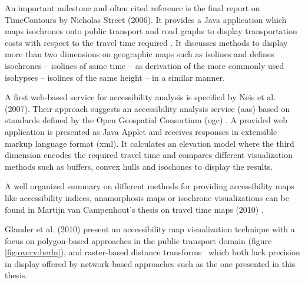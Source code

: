     An important milestone and often cited reference is the final report on
    TimeContours by Nicholas Street (2006). It provides a Java application which
    maps isochrones onto public transport and road graphs to display
    transportation costs with respect to the travel time required
    \cite{street2006timecontours}. It discusses methods to display more than two
    dimensions on geographic maps such as isolines and defines isochrones --
    isolines of same time -- as derivation of the more commonly used isohypses
    -- isolines of the same height -- in a similar manner.\par


    A first web-based service for accessibility analysis is specified by
    Neis et al. (2007). Their approach suggests an accessibility analysis
    service (\acrshort{aas}) based on standards defined by the Open Geospatial
    Consortium (\acrshort{ogc}) \cite{neis2007webbasierte}. A provided web
    application is presented as Java Applet and receives responses in extensible
    markup language format (\acrshort{xml}). It calculates an elevation model
    where the third dimension encodes the required travel time and compares
    different visualization methods such as buffers, convex hulls and isochones
    to display the results.\par

    A well organized summary on different methods for providing accessibility
    maps like accessibility indices, anamorphosis maps or isochrone
    visualizations can be found in Martijn van Campenhout's thesis on travel
    time maps (2010) \cite{van2010travel}.\par



    Glander et al. (2010) present an accessibility map visualization technique
    with a focus on polygon-based approaches in the public transport domain
    \cite{Glander2010} (figure \ref{fig:overv:berln}), and raster-based distance
    transforms~\cite{Mueller2010} which both lack precision in display offered
    by network-based approaches such as the one presented in this thesis.\par

